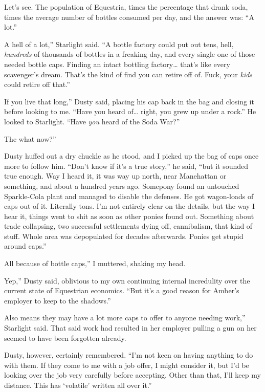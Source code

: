Let’s see. The population of Equestria, times the percentage that drank soda, times the average number of bottles consumed per day, and the answer was: “A lot.”

\leavevmode{}A hell of a lot,” Starlight said. “A bottle factory could put out tens, hell, \textit{hundreds} of thousands of bottles in a freaking day, and every single one of those needed bottle caps. Finding an intact bottling factory… that’s like every scavenger’s dream. That’s the kind of find you can retire off of. Fuck, your \textit{kids} could retire off that.”

\leavevmode{}If you live that long,” Dusty said, placing his cap back in the bag and closing it before looking to me. “Have you heard of… right, you grew up under a rock.” He looked to Starlight. “Have \textit{you} heard of the Soda War?”

\leavevmode{}The what now?”

Dusty huffed out a dry chuckle as he stood, and I picked up the bag of caps once more to follow him. “Don’t know if it’s a true story,” he said, “but it sounded true enough. Way I heard it, it was way up north, near Manehattan or something, and about a hundred years ago. Somepony found an untouched Sparkle-Cola plant and managed to disable the defenses. He got wagon-loads of caps out of it. Literally tons. I’m not entirely clear on the details, but the way I hear it, things went to shit as soon as other ponies found out. Something about trade collapsing, two successful settlements dying off, cannibalism, that kind of stuff. Whole area was depopulated for decades afterwards. Ponies get stupid around caps.”

\leavevmode{}All because of bottle caps,” I muttered, shaking my head.

\leavevmode{}Yep,” Dusty said, oblivious to my own continuing internal incredulity over the current state of Equestrian economics. “But it’s a good reason for Amber’s employer to keep to the shadows.”

\leavevmode{}Also means they may have a lot more caps to offer to anyone needing work,” Starlight said. That said work had resulted in her employer pulling a gun on her seemed to have been forgotten already.

Dusty, however, certainly remembered. “I’m not keen on having anything to do with them. If they come to me with a job offer, I might consider it, but I’d be looking over the job very carefully before accepting. Other than that, I’ll keep my distance. This has ‘volatile’ written all over it.”

